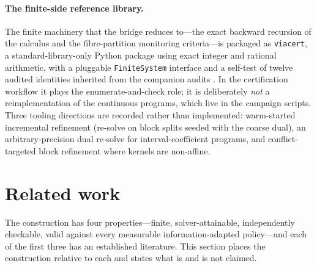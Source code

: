 \documentclass[11pt,a4paper]{article}
\theoremstyle{plain}
\theoremstyle{definition}
\theoremstyle{remark}
\begin{document}
\paragraph{The finite-side reference library.}
The finite machinery that the bridge reduces to---the exact backward recursion of the calculus and the fibre-partition monitoring criteria---is packaged as \texttt{viacert}, a standard-library-only Python package using exact integer and rational arithmetic, with a pluggable \texttt{FiniteSystem} interface and a self-test of twelve audited identities inherited from the companion audits \cite{Abaee2026calc,Abaee2026worked}. In the certification workflow it plays the enumerate-and-check role; it is deliberately \emph{not} a reimplementation of the continuous programs, which live in the campaign scripts. Three tooling directions are recorded rather than implemented: warm-started incremental refinement (re-solve on block splits seeded with the coarse dual), an arbitrary-precision dual re-solve for interval-coefficient programs, and conflict-targeted block refinement where kernels are non-affine.
\section{Related work}\label{sec:related}

The construction has four properties---finite, solver-attainable, independently checkable, valid against every measurable information-adapted policy---and each of the first three has an established literature. This section places the construction relative to each and states what is and is not claimed.
\end{document}
